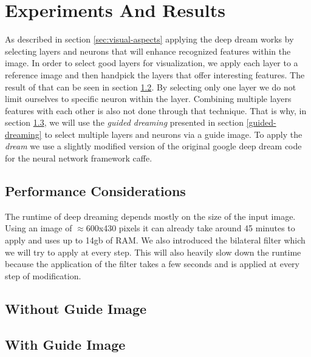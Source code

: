 \section{Experiments And Results}
\label{sec:evaluation}
As described in section \ref{sec:visual-aspects} applying the deep dream works by selecting layers and neurons that will enhance recognized features within the image.
In order to select good layers for visualization, we apply each layer to a reference image and then handpick the layers that offer interesting features. The result of that can be seen in section \ref{sec:withoutguide}.
By selecting only one layer we do not limit ourselves to specific neuron within the layer. Combining multiple layers features with each other is also not done through that technique. That is why, in section \ref{sec:withguide}, we will use the \emph{guided dreaming} presented in section \ref{guided-dreaming} to select multiple layers and neurons via a guide image.
To apply the \emph{dream} we use a slightly modified version of the original google deep dream code for the neural network framework caffe\cite{googledeepdream}.

\subsection{Performance Considerations}
The runtime of deep dreaming depends mostly on the size of the input image.
Using an image of $\approx$600x430 pixels it can already take around 45 minutes to apply and uses up to 14gb of RAM.
We also introduced the bilateral filter which we will try to apply at every step. This will also heavily slow down the runtime because the application of the filter takes a few seconds and is applied at every step of modification.
\subsection{Without Guide Image}
\label{sec:withoutguide}


\subsection{With Guide Image}
\label{sec:withguide}

